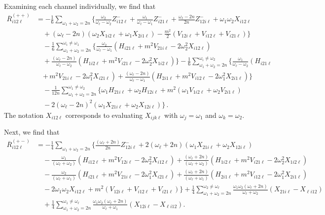 \documentclass[letterpaper,11pt]{article}
\newcommand{\oi}{\omega_i}
\newcommand{\ol}{\omega_\ell}
\newcommand{\oone}{\omega_1}
\newcommand{\otwo}{\omega_2}
\begin{document}
Examining each channel individually, we find that
\begin{align}
\label{R1}
\overline{R}^{(++)}_{i 1 2 \ell} &= - \frac{1}{6} \sum_{\oone + \otwo = 2n} \Big\{ \frac{\otwo}{\ol - \otwo} Z^{-}_{i12\ell} + \frac{\oone}{\ol - \oone} Z^{-}_{i21\ell} + \frac{\ol - 2n}{2n} Z^-_{12i\ell} + \oone \otwo X_{i12\ell}  \nonumber \\
%
& \quad + (\ol - 2n)\left(\otwo X_{1i2\ell} + \oone X_{2i1\ell} \right) - \frac{m^2}{2} \left(V_{12i\ell} + V_{i12\ell} + V_{i21\ell} \right) \Big\} \nonumber \\
%
& \quad - \frac{1}{6} \sum_{\oone + \otwo = 2n}^{\oi \neq \oone} \Big\{ \frac{\otwo}{\ol - \oone} \left( H_{i21\ell} + m^2 V_{21i\ell} - 2\otwo^2 X_{i12\ell} \right) \nonumber \\
%
& \quad + \frac{(\ol - 2n)}{\ol - \otwo} \left( H_{1i2\ell} + m^2 V_{i21\ell} - 2\otwo^2 X_{1i2\ell} \right) \Big\} - \frac{1}{6} \sum_{\oone + \otwo = 2n}^{\oi \neq \otwo} \Big\{  \frac{\oone}{\ol - \otwo} \left( H_{i21\ell} \right. \nonumber \\
%
& \quad \left. + \,m^2 V_{21i\ell} - 2\oone^2 X_{i 21 \ell} \right) + \frac{(\ol - 2n)}{\ol - \oone} \left( H_{2i1\ell} + m^2 V_{i 12 \ell} - 2 \oone^2 X_{2i1\ell} \right) \Big\} \nonumber \\
%
& \quad -\frac{1}{12n} \sum_{\oone + \otwo = 2n}^{\oone \neq \otwo} \Big\{ \oone H_{21i\ell} + \otwo H_{12i\ell} + m^2 \left( \oone V_{1i2\ell} + \otwo V_{2i1\ell} \right) \nonumber \\
%
& \quad - 2 \left(\ol - 2n\right)^2 \left(\oone X_{21i\ell} + \otwo X_{12i\ell} \right) \Big \} \, .
\end{align}
The notation $X_{i12\ell}$ corresponds to evaluating $X_{ijk\ell}$ with $\omega_j = \oone$ and $\omega_k = \otwo$. 

Next, we find that
\begin{align}
\label{R2}
\overline{R}_{i12\ell}^{(+-)} &= - \frac{1}{4} \sum_{\oone + \otwo = 2n} \Big\{ \frac{(\ol + 2n)}{2n} Z^-_{12i\ell} + 2 (\ol + 2n) \left( \oone X_{21i\ell} + \otwo X_{12i\ell} \right) \nonumber \\
%
& \quad  -\frac{\oone}{(\ol + \otwo)} \left( H_{i12\ell} + m^2 V_{12i\ell} - 2 \otwo^2 X_{i12\ell} \right) + \frac{(\ol + 2n)}{(\ol + \otwo)} \left( H_{1i2\ell} + m^2 V_{i21\ell} - 2\otwo^2 X_{1i2\ell} \right)  \nonumber \\
%
& \quad - \frac{\otwo}{(\ol + \oone)} \left( H_{i21\ell} + m^2 V_{21i\ell} - 2\oone^2 X_{i21\ell} \right) + \frac{(\ol + 2n)}{(\ol + \oone)} \left(H_{2i1\ell} + m^2 V_{i12\ell} - 2\oone^2 X_{2i1\ell} \right)  \nonumber \\
%
& \quad  - 2 \oone\otwo X_{i12\ell} + m^2 \left( V_{12i\ell} + V_{i12\ell} + V_{i21\ell} \right) \Big\} + \frac{1}{4} \sum^{\otwo \neq \ol}_{\oone + \otwo = 2n} \frac{\oone\otwo(\ol + 2n)}{\ol + \otwo} \left( X_{21i\ell} - X_{\ell i 12} \right) \nonumber \\
%
& \quad + \frac{1}{4} \sum^{\oone \neq \ol}_{\oone + \otwo = 2n} \frac{\oone\otwo(\ol + 2n)}{\ol + \oone} \left( X_{12i\ell} - X_{\ell i 12} \right).
\end{align}
\end{document}
